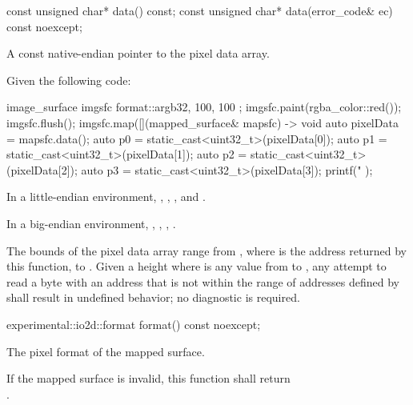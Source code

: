 \begin{itemdecl}
const unsigned char* data() const;
const unsigned char* data(error_code& ec) const noexcept;
\end{itemdecl}
\begin{itemdescr}
\pnum
\returns
A const native-endian pointer to the pixel data array.
\begin{example}
Given the following code:

\begin{codeblock}
image_surface imgsfc{ format::argb32, 100, 100 };
imgsfc.paint(rgba_color::red());
imgsfc.flush();
imgsfc.map([](mapped_surface& mapsfc) -> void {
    auto pixelData = mapsfc.data();
    auto p0 = static_cast<uint32_t>(pixelData[0]);
    auto p1 = static_cast<uint32_t>(pixelData[1]);
    auto p2 = static_cast<uint32_t>(pixelData[2]);
    auto p3 = static_cast<uint32_t>(pixelData[3]);
    printf("%
});
\end{codeblock}

In a little-endian environment, , , , and .

In a big-endian environment, , , , .
\end{example}

\pnum
\remarks
The bounds of the pixel data array range from , where  is the address returned by this function, to . Given a height  where  is any value from  to , any attempt to read a byte with an address that is not within the range of addresses defined by  shall result in undefined behavior; no diagnostic is required.
\end{itemdescr}

\begin{itemdecl}
experimental::io2d::format format() const noexcept;
\end{itemdecl}
\begin{itemdescr}
\pnum
\returns
The pixel format of the mapped surface.

\pnum
\remarks
If the mapped surface is invalid, this function shall return \\
.
\end{itemdescr}

